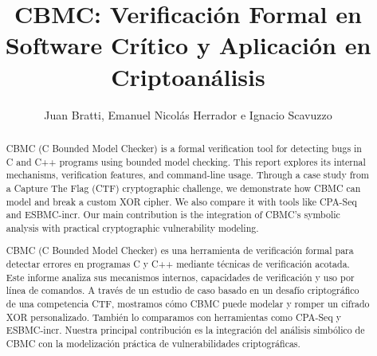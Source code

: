 \documentclass[runningheads]{llncs}
\begin{document}
%
\title{CBMC: Verificación Formal en Software Crítico y Aplicación en Criptoanálisis}

%
\author{
  Juan Bratti, 
  Emanuel Nicolás Herrador e
  Ignacio Scavuzzo
}


\maketitle

%
\renewcommand{\abstractname}{Abstract}
\begin{abstract}
  CBMC (C Bounded Model Checker) is a formal verification tool for detecting bugs in C and C++ programs using bounded model checking.
  This report explores its internal mechanisms, verification features, and command-line usage. 
  Through a case study from a Capture The Flag (CTF) cryptographic challenge, we demonstrate how CBMC can model and break a custom XOR cipher.
  We also compare it with tools like CPA-Seq and ESBMC-incr.
  Our main contribution is the integration of CBMC’s symbolic analysis with practical cryptographic vulnerability modeling.

\end{abstract}

\renewcommand{\abstractname}{Resumen}
\begin{abstract}
  CBMC (C Bounded Model Checker) es una herramienta de verificación formal para detectar errores en programas C y C++ mediante técnicas de verificación acotada.
  Este informe analiza sus mecanismos internos, capacidades de verificación y uso por línea de comandos.
  A través de un estudio de caso basado en un desafío criptográfico de una competencia CTF, mostramos cómo CBMC puede modelar y romper un cifrado XOR personalizado.
  También lo comparamos con herramientas como CPA-Seq y ESBMC-incr.
  Nuestra principal contribución es la integración del análisis simbólico de CBMC con la modelización práctica de vulnerabilidades criptográficas.
\end{abstract}
\end{document}
